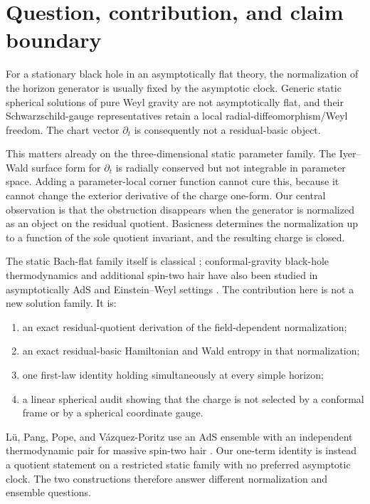 \documentclass[11pt]{article}
\theoremstyle{definition}
\theoremstyle{remark}
\begin{document}
\tableofcontents

\section{Question, contribution, and claim boundary}

For a stationary black hole in an asymptotically flat theory, the
normalization of the horizon generator is usually fixed by the asymptotic
clock.  Generic static spherical solutions of pure Weyl gravity are not
asymptotically flat, and their Schwarzschild-gauge representatives retain a
local radial-diffeomorphism/Weyl freedom.  The chart vector
\(\partial_t\) is consequently not a residual-basic object.

This matters already on the three-dimensional static parameter family.  The
Iyer--Wald surface form for \(\partial_t\) is radially conserved but not
integrable in parameter space.  Adding a parameter-local corner function
cannot cure this, because it cannot change the exterior derivative of the
charge one-form.  Our central observation is that the obstruction disappears
when the generator is normalized as an object on the residual quotient.
Basicness determines the normalization up to a function of the sole quotient
invariant, and the resulting charge is closed.

The static Bach-flat family itself is classical
\cite{Riegert,MannheimKazanas}; conformal-gravity black-hole thermodynamics
and additional spin-two hair have also been studied in asymptotically AdS
and Einstein--Weyl settings \cite{LuPangPopeVP}.  The contribution here is
not a new solution family.  It is:
\begin{enumerate}
\item an exact residual-quotient derivation of the field-dependent
      normalization;
\item an exact residual-basic Hamiltonian and Wald entropy in that
      normalization;
\item one first-law identity holding simultaneously at every simple horizon;
\item a linear spherical audit showing that the charge is not selected by a
      conformal frame or by a spherical coordinate gauge.
\end{enumerate}
L\"u, Pang, Pope, and V\'azquez-Poritz use an AdS ensemble with an
independent thermodynamic pair for massive spin-two hair
\cite{LuPangPopeVP}.  Our one-term identity is instead a quotient statement
on a restricted static family with no preferred asymptotic clock.  The two
constructions therefore answer different normalization and ensemble
questions.
\end{document}
